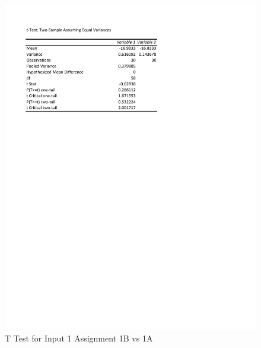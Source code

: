 \documentclass[times]{article}
\begin{document}
	\begin{figure}
		\caption{T Test for Input 1 Assignment 1B vs 1A}
		\label{fig:t_test1}
		\includegraphics[width=\textwidth]{./tests/Input1_t_test.pdf}
	\end{figure}
\end{document}
